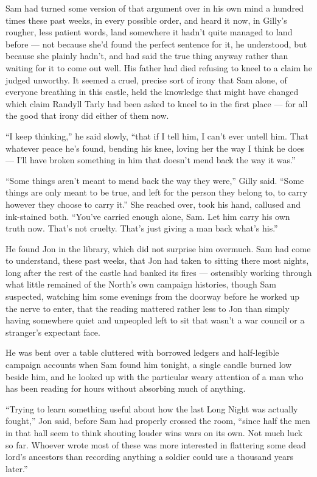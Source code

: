 Sam had turned some version of that argument over in his own mind a hundred times these past weeks, in every possible order, and heard it now, in Gilly’s rougher, less patient words, land somewhere it hadn’t quite managed to land before — not because she’d found the perfect sentence for it, he understood, but because she plainly hadn’t, and had said the true thing anyway rather than waiting for it to come out well. His father had died refusing to kneel to a claim he judged unworthy. It seemed a cruel, precise sort of irony that Sam alone, of everyone breathing in this castle, held the knowledge that might have changed which claim Randyll Tarly had been asked to kneel to in the first place — for all the good that irony did either of them now.

“I keep thinking,” he said slowly, “that if I tell him, I can’t ever untell him. That whatever peace he’s found, bending his knee, loving her the way I think he does — I’ll have broken something in him that doesn’t mend back the way it was.”

“Some things aren’t meant to mend back the way they were,” Gilly said. “Some things are only meant to be true, and left for the person they belong to, to carry however they choose to carry it.” She reached over, took his hand, callused and ink-stained both. “You’ve carried enough alone, Sam. Let him carry his own truth now. That’s not cruelty. That’s just giving a man back what’s his.”

\sceneBreak

He found Jon in the library, which did not surprise him overmuch. Sam had come to understand, these past weeks, that Jon had taken to sitting there most nights, long after the rest of the castle had banked its fires — ostensibly working through what little remained of the North’s own campaign histories, though Sam suspected, watching him some evenings from the doorway before he worked up the nerve to enter, that the reading mattered rather less to Jon than simply having somewhere quiet and unpeopled left to sit that wasn’t a war council or a stranger’s expectant face.

He was bent over a table cluttered with borrowed ledgers and half-legible campaign accounts when Sam found him tonight, a single candle burned low beside him, and he looked up with the particular weary attention of a man who has been reading for hours without absorbing much of anything.

“Trying to learn something useful about how the last Long Night was actually fought,” Jon said, before Sam had properly crossed the room, “since half the men in that hall seem to think shouting louder wins wars on its own. Not much luck so far. Whoever wrote most of these was more interested in flattering some dead lord’s ancestors than recording anything a soldier could use a thousand years later.”

